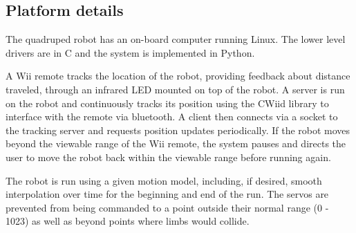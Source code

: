 \subsection{Platform details}













The quadruped robot has an on-board computer running Linux. The lower
level drivers are in C and the system is implemented in
Python. 


A Wii remote tracks the location of the robot, providing feedback
about distance traveled, through an infrared LED mounted on top of 
the robot. A server is run on the robot and continuously tracks its
position using the CWiid library\cite{cwiid} to interface with the remote
via bluetooth. A client then connects via a socket to the tracking
server and requests position updates periodically. If the robot moves 
beyond the viewable range of the Wii remote, the system pauses and
directs the user to move the robot back within the viewable range 
before running again.

The robot is run using a given motion model, including, if desired, 
smooth interpolation over time for the beginning and end of the run. 
The servos are prevented from being commanded to a point outside their
normal range (0 - 1023) as well as beyond points where limbs would collide.
